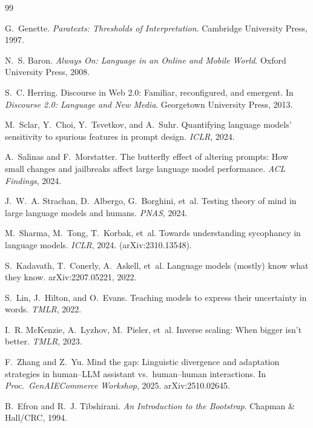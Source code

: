 \documentclass[10pt, letterpaper]{article}
\begin{document}
\begin{thebibliography}{99}

G.~Genette.
\newblock \emph{Paratexts: Thresholds of Interpretation}.
\newblock Cambridge University Press, 1997.

N.~S. Baron.
\newblock \emph{Always On: Language in an Online and Mobile World}.
\newblock Oxford University Press, 2008.

S.~C. Herring.
\newblock Discourse in Web 2.0: Familiar, reconfigured, and emergent.
\newblock In \emph{Discourse 2.0: Language and New Media}. Georgetown University Press, 2013.

M.~Sclar, Y.~Choi, Y.~Tsvetkov, and A.~Suhr.
\newblock Quantifying language models' sensitivity to spurious features in prompt design.
\newblock \emph{ICLR}, 2024.

A.~Salinas and F.~Morstatter.
\newblock The butterfly effect of altering prompts: How small changes and jailbreaks affect large language model performance.
\newblock \emph{ACL Findings}, 2024.

J.~W.~A. Strachan, D.~Albergo, G.~Borghini, et~al.
\newblock Testing theory of mind in large language models and humans.
\newblock \emph{PNAS}, 2024.

M.~Sharma, M.~Tong, T.~Korbak, et~al.
\newblock Towards understanding sycophancy in language models.
\newblock \emph{ICLR}, 2024. (arXiv:2310.13548).

S.~Kadavath, T.~Conerly, A.~Askell, et~al.
\newblock Language models (mostly) know what they know.
\newblock arXiv:2207.05221, 2022.

S.~Lin, J.~Hilton, and O.~Evans.
\newblock Teaching models to express their uncertainty in words.
\newblock \emph{TMLR}, 2022.

I.~R. McKenzie, A.~Lyzhov, M.~Pieler, et~al.
\newblock Inverse scaling: When bigger isn't better.
\newblock \emph{TMLR}, 2023.

F.~Zhang and Z.~Yu.
\newblock Mind the gap: Linguistic divergence and adaptation strategies in human--LLM assistant vs.\ human--human interactions.
\newblock In \emph{Proc.\ GenAIECommerce Workshop}, 2025. arXiv:2510.02645.

B.~Efron and R.~J. Tibshirani.
\newblock \emph{An Introduction to the Bootstrap}.
\newblock Chapman \& Hall/CRC, 1994.

\end{thebibliography}
\end{document}
